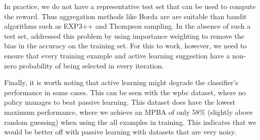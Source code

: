 \documentclass[fleqn,10pt,lineno]{wlpeerj} %
\begin{document}
In practice, we do not have a representative test set that can be used to
compute the reward. Thus aggregation methods like Borda are are suitable than
bandit algorithms such as EXP3++ and Thompson sampling. In the absence of such
a test set, \cite{hsu15} addressed this problem by using importance weighting
to remove the bias in the accuracy on the training set. For this to work,
however, we need to ensure that every training example and active learning
suggestion have a non-zero probability of being selected in every iteration.

Finally, it is worth noting that active learning might degrade the classifier's
performance in some cases. This can be seen with the wpbc dataset, where no
policy manages to beat passive learning. This dataset does have the lowest
maximum performance, where we achieve an MPBA of only 58\% (slightly above
random guessing) when using the all examples in training. This indicates that
we would be better off with passive learning with datasets that are very noisy.
\end{document}
